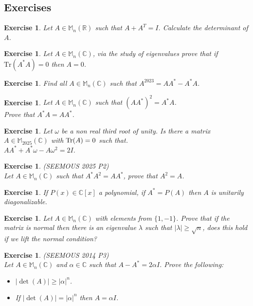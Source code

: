 \documentclass[12pt]{article}
\theoremstyle{definition}
\theoremstyle{remark}
\theoremstyle{plain}
\newtheorem{ex}[subsubsection]{Exercise}
\begin{document}
\subsection{Exercises}
\begin{ex}
    Let $A\in \mathbb{M}_n(\mathbb{R})$ such that $A+A^T=I$. Calculate the determinant of $A$.
\end{ex}
\begin{ex}
    Let $A\in \mathbb{M}_n(\mathbb{C})$, via the study of eigenvalues prove that if $\mathrm{Tr}(A^*A)=0$ then $A=0$.
\end{ex}
\begin{ex}
    Find all $A\in \mathbb{M}_n(\mathbb{C})$ such that $A^{2023}=AA^*-A^*A$.
\end{ex}
\begin{ex}
    Let $A\in \mathbb{M}_n(\mathbb{C})$ such that $(AA^*)^2=A^*A$.\\
    Prove that $A^*A=AA^*$.
\end{ex}
\begin{ex}
    Let $\omega$ be a non real third root of unity. Is there a matrix $A\in \mathbb{M}_{2025}(\mathbb{C})$ with $\Tr(A)=0$ such that.\\
    $AA^*+A^*\omega-A\omega^2=2I$.
\end{ex}
\begin{ex}\textup{(SEEMOUS 2025 P2)}\\
Let $A\in \mathbb{M}_n(\mathbb{C})$ such that $A^*A^2=AA^*$, prove that $A^2=A$.    
\end{ex}
\begin{ex}
If $P(x)\in \mathbb{C}[x]$ a polynomial, if $A^*=P(A)$ then $A$ is unitarily diagonalizable.	
\end{ex}
\begin{ex}
    Let $A\in \mathbb{M}_n(\mathbb{C})$ with elements from $\{1,-1\}$.
    Prove that if the matrix is normal then there is an eigenvalue $\lambda$ such that $|\lambda|\geq \sqrt{n}$, does this hold if we lift the normal condition?
\end{ex}
\begin{ex}\textup{(SEEMOUS 2014 P3)}\\
Let $A\in \mathbb{M}_n(\mathbb{C})$ and $\alpha\in \mathbb{C}$ such that $A-A^*=2\alpha I$. Prove the following: 
\begin{itemize}
    \item $|\det(A)|\geq |\alpha|^n$.
    \item If $|\det(A)|=|\alpha|^n$ then $A=\alpha I$.
\end{itemize}
\end{ex}
\newpage
\end{document}
